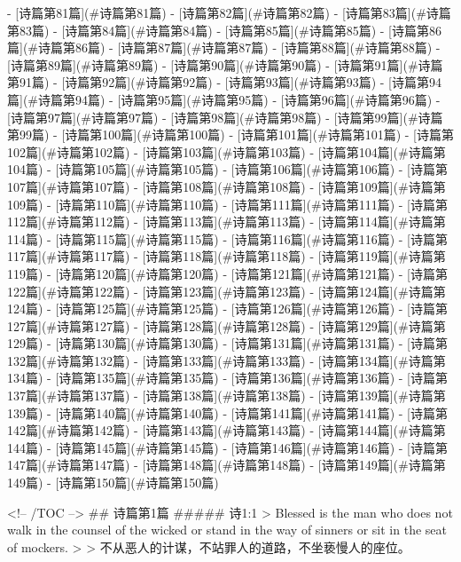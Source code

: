    - [诗篇第81篇](#诗篇第81篇)
    - [诗篇第82篇](#诗篇第82篇)
    - [诗篇第83篇](#诗篇第83篇)
    - [诗篇第84篇](#诗篇第84篇)
    - [诗篇第85篇](#诗篇第85篇)
    - [诗篇第86篇](#诗篇第86篇)
    - [诗篇第87篇](#诗篇第87篇)
    - [诗篇第88篇](#诗篇第88篇)
    - [诗篇第89篇](#诗篇第89篇)
    - [诗篇第90篇](#诗篇第90篇)
    - [诗篇第91篇](#诗篇第91篇)
    - [诗篇第92篇](#诗篇第92篇)
    - [诗篇第93篇](#诗篇第93篇)
    - [诗篇第94篇](#诗篇第94篇)
    - [诗篇第95篇](#诗篇第95篇)
    - [诗篇第96篇](#诗篇第96篇)
    - [诗篇第97篇](#诗篇第97篇)
    - [诗篇第98篇](#诗篇第98篇)
    - [诗篇第99篇](#诗篇第99篇)
    - [诗篇第100篇](#诗篇第100篇)
    - [诗篇第101篇](#诗篇第101篇)
    - [诗篇第102篇](#诗篇第102篇)
    - [诗篇第103篇](#诗篇第103篇)
    - [诗篇第104篇](#诗篇第104篇)
    - [诗篇第105篇](#诗篇第105篇)
    - [诗篇第106篇](#诗篇第106篇)
    - [诗篇第107篇](#诗篇第107篇)
    - [诗篇第108篇](#诗篇第108篇)
    - [诗篇第109篇](#诗篇第109篇)
    - [诗篇第110篇](#诗篇第110篇)
    - [诗篇第111篇](#诗篇第111篇)
    - [诗篇第112篇](#诗篇第112篇)
    - [诗篇第113篇](#诗篇第113篇)
    - [诗篇第114篇](#诗篇第114篇)
    - [诗篇第115篇](#诗篇第115篇)
    - [诗篇第116篇](#诗篇第116篇)
    - [诗篇第117篇](#诗篇第117篇)
    - [诗篇第118篇](#诗篇第118篇)
    - [诗篇第119篇](#诗篇第119篇)
    - [诗篇第120篇](#诗篇第120篇)
    - [诗篇第121篇](#诗篇第121篇)
    - [诗篇第122篇](#诗篇第122篇)
    - [诗篇第123篇](#诗篇第123篇)
    - [诗篇第124篇](#诗篇第124篇)
    - [诗篇第125篇](#诗篇第125篇)
    - [诗篇第126篇](#诗篇第126篇)
    - [诗篇第127篇](#诗篇第127篇)
    - [诗篇第128篇](#诗篇第128篇)
    - [诗篇第129篇](#诗篇第129篇)
    - [诗篇第130篇](#诗篇第130篇)
    - [诗篇第131篇](#诗篇第131篇)
    - [诗篇第132篇](#诗篇第132篇)
    - [诗篇第133篇](#诗篇第133篇)
    - [诗篇第134篇](#诗篇第134篇)
    - [诗篇第135篇](#诗篇第135篇)
    - [诗篇第136篇](#诗篇第136篇)
    - [诗篇第137篇](#诗篇第137篇)
    - [诗篇第138篇](#诗篇第138篇)
    - [诗篇第139篇](#诗篇第139篇)
    - [诗篇第140篇](#诗篇第140篇)
    - [诗篇第141篇](#诗篇第141篇)
    - [诗篇第142篇](#诗篇第142篇)
    - [诗篇第143篇](#诗篇第143篇)
    - [诗篇第144篇](#诗篇第144篇)
    - [诗篇第145篇](#诗篇第145篇)
    - [诗篇第146篇](#诗篇第146篇)
    - [诗篇第147篇](#诗篇第147篇)
    - [诗篇第148篇](#诗篇第148篇)
    - [诗篇第149篇](#诗篇第149篇)
    - [诗篇第150篇](#诗篇第150篇)

<!-- /TOC -->
## 诗篇第1篇
##### 诗1:1
> Blessed is the man who does not walk in the counsel of the wicked or stand in the way of sinners or sit in the seat of mockers.
>
> 不从恶人的计谋，不站罪人的道路，不坐亵慢人的座位。


